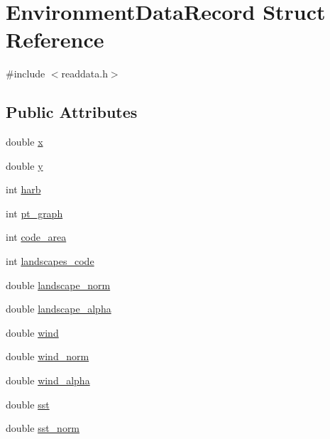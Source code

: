 \hypertarget{struct_environment_data_record}{}\section{Environment\+Data\+Record Struct Reference}
\label{struct_environment_data_record}


{\ttfamily \#include $<$readdata.\+h$>$}

\subsection*{Public Attributes}
\begin{DoxyCompactItemize}
\item 
double \mbox{\hyperlink{struct_environment_data_record_a28674c1e867a14d904e2b61db5bb6eaf}{x}}
\item 
double \mbox{\hyperlink{struct_environment_data_record_a78530505bc2ca0d1a41e6eaaec239237}{y}}
\item 
int \mbox{\hyperlink{struct_environment_data_record_a12b37731a799d06858d1767bf1d33aa9}{harb}}
\item 
int \mbox{\hyperlink{struct_environment_data_record_af22c7332157062e210871f2847e5a3aa}{pt\+\_\+graph}}
\item 
int \mbox{\hyperlink{struct_environment_data_record_ad3ec4b33bc68992028ee456ed5b8fa80}{code\+\_\+area}}
\item 
int \mbox{\hyperlink{struct_environment_data_record_a0f5ca9dca6f553a9e8986cc924578f52}{landscapes\+\_\+code}}
\item 
double \mbox{\hyperlink{struct_environment_data_record_a62e7220dc4eed460f97260517738ff83}{landscape\+\_\+norm}}
\item 
double \mbox{\hyperlink{struct_environment_data_record_af107e5e25dd138b4b3dc952fe9abeb4c}{landscape\+\_\+alpha}}
\item 
double \mbox{\hyperlink{struct_environment_data_record_a267c997f38fb5b1550c38d62b03da8f8}{wind}}
\item 
double \mbox{\hyperlink{struct_environment_data_record_ab32d5fa001dfe73978327cd3bc01a538}{wind\+\_\+norm}}
\item 
double \mbox{\hyperlink{struct_environment_data_record_acd9d0a567490975693780388b79e2f46}{wind\+\_\+alpha}}
\item 
double \mbox{\hyperlink{struct_environment_data_record_ac38b630a1cffac6f2bfa0093ba31ff43}{sst}}
\item 
double \mbox{\hyperlink{struct_environment_data_record_a1786aed81f84012023ef2379b9715e8d}{sst\+\_\+norm}}

\end{DoxyCompactItemize}
